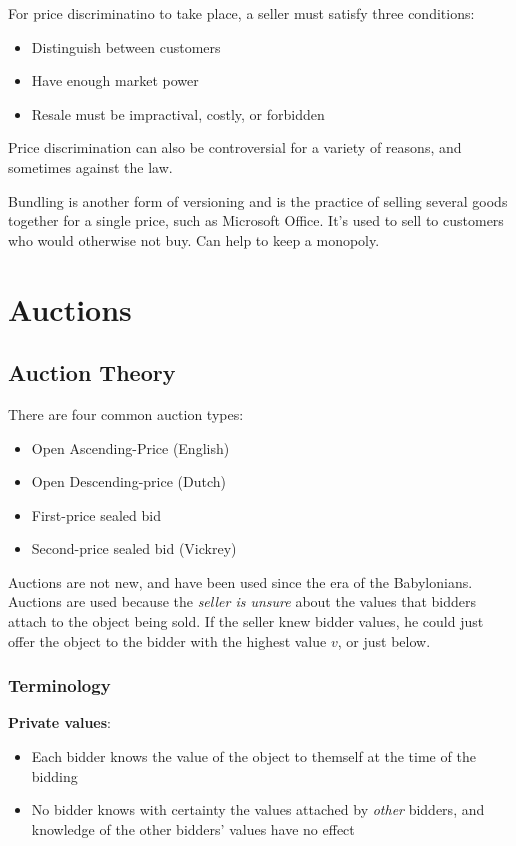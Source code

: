 \documentclass[11pt,a4paper,titlepage,dvipsnames,cmyk]{scrartcl}
\begin{document}
For price discriminatino to take place, a seller must satisfy three conditions:
\begin{itemize}
    \item Distinguish between customers
    \item Have enough market power
    \item Resale must be impractival, costly, or forbidden
\end{itemize}

Price discrimination can also be controversial for a variety of reasons, and sometimes against the law.

Bundling is another form of versioning and is the practice of selling several goods together for a single price, such as Microsoft Office. It's used to sell to customers who would otherwise not buy. Can help to keep a monopoly.

\section{Auctions}
\subsection{Auction Theory}
There are four common auction types:
\begin{itemize}
    \item Open Ascending-Price (English)
    \item Open Descending-price (Dutch)
    \item First-price sealed bid
    \item Second-price sealed bid (Vickrey)
\end{itemize}

Auctions are not new, and have been used since the era of the Babylonians. Auctions are used because the \textit{seller is unsure} about the values that bidders attach to the object being sold. If the seller knew bidder values, he could just offer the object to the bidder with the highest value $v$, or just below.

\subsubsection{Terminology}
\textbf{Private values}:
\begin{itemize}
    \item Each bidder knows the value of the object to themself at the time of the bidding
    \item No bidder knows with certainty the values attached by \textit{other} bidders, and knowledge of the other bidders' values have no effect
\end{itemize}
\end{document}

